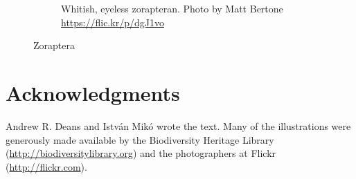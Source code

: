 \documentclass[letterpaper, 11pt]{article}
\begin{document}
\begin{figure}[ht!]
\begin{subfigure}[ht!]{0.45\textwidth}
        \caption{Whitish, eyeless zorapteran. Photo \textcopyright{} by Matt Bertone \url{https://flic.kr/p/dgJ1vo}}
        \label{fig:zorapwhite}
    \end{subfigure}
    \caption{Zoraptera}\label{fig:zorapterans}
\end{figure}

\FloatBarrier

\section*{Acknowledgments}
Andrew R. Deans and Istv\'an Mik\'o wrote the text. Many of the illustrations were generously made available by the Biodiversity Heritage Library (\url{http://biodiversitylibrary.org}) and the photographers at Flickr (\url{http://flickr.com}).

\FloatBarrier


\end{document}
